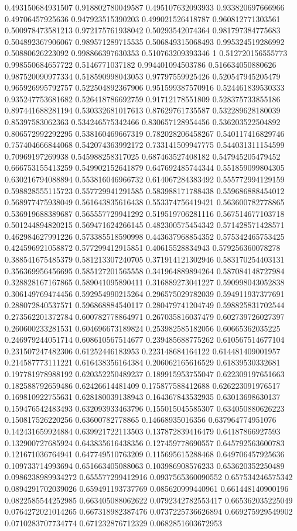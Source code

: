 \begin{table}
\begin{tabu}
\begin{sparkline}{10}
0.493150684931507 0.918802780049587 0.495107632093933 0.933820697666966 0.49706457925636 0.947923515390203 0.499021526418787 0.960812771303561 0.500978473581213 0.972175761938042 0.50293542074364 0.981797384775683 0.504892367906067 0.989571289715535 0.506849315068493 0.995324519286992 0.50880626223092 0.998866397630353 0.510763209393346 1 0.512720156555773 0.998550684657722 0.5146771037182 0.994401094503786 0.516634050880626 0.987520090977334 0.518590998043053 0.97797559925426 0.520547945205479 0.965926995792757 0.522504892367906 0.951599387570916 0.524461839530333 0.935247753681682 0.526418786692759 0.91712178551809 0.528375733855186 0.897441688281194 0.530332681017613 0.87629761735587 0.532289628180039 0.85397583062363 0.534246575342466 0.830657128954456 0.536203522504892 0.806572992292295 0.538160469667319 0.782028206458267 0.540117416829746 0.757404666844068 0.542074363992172 0.733141509947775 0.544031311154599 0.70969197269938 0.545988258317025 0.687463527408182 0.547945205479452 0.666753155413259 0.549902152641879 0.647692485744344 0.551859099804305 0.630216794088894 0.553816046966732 0.614067284383492 0.555772994129159 0.598828555115723 0.557729941291585 0.583988171788438 0.559686888454012 0.568977475938049 0.561643835616438 0.553374756419421 0.563600782778865 0.536919688389687 0.565557729941292 0.519519706281116 0.567514677103718 0.501244894820215 0.569471624266145 0.482300575454342 0.571428571428571 0.462984627991226 0.573385518590998 0.443637968854352 0.575342465753425 0.424596921058872 0.577299412915851 0.40615528834943 0.579256360078278 0.388541675485379 0.581213307240705 0.371914121302946 0.583170254403131 0.356369956456695 0.585127201565558 0.341964889894264 0.587084148727984 0.328828167167865 0.589041095890411 0.316889273041227 0.590998043052838 0.306149769474456 0.592954990215264 0.296575029782039 0.594911937377691 0.288072840537571 0.596868884540117 0.280479741204749 0.598825831702544 0.273562201372784 0.600782778864971 0.267035816037479 0.602739726027397 0.260600233281531 0.604696673189824 0.253982585182056 0.60665362035225 0.246979244051714 0.608610567514677 0.239485688775262 0.610567514677104 0.231507247482306 0.61252446183953 0.223148684164122 0.614481409001957 0.214587773111221 0.616438356164384 0.206062165616529 0.61839530332681 0.197781978988192 0.620352250489237 0.189915953755047 0.622309197651663 0.182588792659486 0.62426614481409 0.175877588412688 0.626223091976517 0.169810922755631 0.628180039138943 0.164367843532935 0.63013698630137 0.159476542483493 0.632093933463796 0.155015045585307 0.634050880626223 0.150817526220256 0.63600782778865 0.14668935016356 0.637964774951076 0.142431659924884 0.639921722113503 0.137872839416479 0.64187866927593 0.132900727685924 0.643835616438356 0.127459778690557 0.645792563600783 0.121671036764941 0.647749510763209 0.115695615288468 0.649706457925636 0.109733714993694 0.651663405088063 0.103986908576233 0.653620352250489 0.0986238989934272 0.655577299412916 0.0937565360090552 0.657534246575342 0.0894291702039026 0.659491193737769 0.085620999440961 0.661448140900196 0.0822585544252985 0.663405088062622 0.0792342782553417 0.665362035225049 0.0764272021014265 0.667318982387476 0.0737225736626894 0.669275929549902 0.0710283707734774 0.671232876712329 0.0682851603672953 
\end{sparkline}
\end{tabu}
\end{table}
